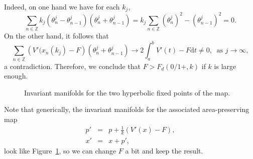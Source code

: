 \documentclass[12pt]{article}
\newcommand{\Z}{\mathbb{Z}}
\begin{document}
Indeed, on one hand we have for each $k_j$,
$$
\sum_{n\in\Z}k_j(\theta_n^j-\theta_{n-1}^j)(\theta_n^j+\theta_{n-1}^j)=k_j\sum_{n\in\Z}(\theta_n^j)^2-(\theta_{n-1}^j)^2=0.
$$
On the other hand, it follows that
$$
\sum_{n\in\Z}\left(V'(x_n(k_j)-F\right)(\theta_n^j+\theta_{n-1}^j)\to 2\int_{a}^{b}V'(t)-F\mbox{d}t\neq 0,\ \mbox{ as }j\to\infty,
$$
a contradiction. Therefore, we conclude that $F>F_d(0/1+,k)$ if $k$ is large enough.



\begin{figure}[htbp] %
   \centering
   \caption{Invariant manifolds for the two hyperbolic fixed points of the map.}
   \label{fig:invmflds}
\end{figure}


Note that generically, the invariant manifolds for the associated area-preserving map
\begin{eqnarray}
p' &=& p + \frac{1}{k}(V'(x)-F), \\
x' &=& x+p',
\end{eqnarray}
look like Figure~\ref{fig:invmflds}, so we can change $F$ a bit and keep the result.
\end{document}
